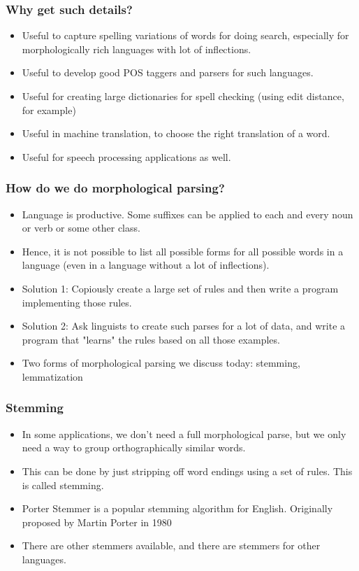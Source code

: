 \documentclass{beamer}
\begin{document}
\begin{frame}
\frametitle{Why get such details?}
\begin{itemize}
\item Useful to capture spelling variations of words for doing search, especially for morphologically rich languages with lot of inflections.
\item Useful to develop good POS taggers and parsers for such languages.
\item Useful for creating large dictionaries for spell checking (using edit distance, for example)
\item Useful in machine translation, to choose the right translation of a word.
\item Useful for speech processing applications as well.
\end{itemize}
\end{frame}

\begin{frame}
\frametitle{How do we do morphological parsing?}
\begin{itemize}
\item Language is productive. Some suffixes can be applied to each and every noun or verb or some other class.
\item Hence, it is not possible to list all possible forms for all possible words in a language (even in a language without a lot of inflections). 
\item Solution 1: Copiously create a large set of rules and then write a program implementing those rules.
\item Solution 2: Ask linguists to create such parses for a lot of data, and write a program that "learns" the rules based on all those examples.
\item Two forms of morphological parsing we discuss today: stemming, lemmatization
\end{itemize}
\end{frame}

\begin{frame}
\frametitle{Stemming}
\begin{itemize}
\item In some applications, we don't need a full morphological parse, but we only need a way to group orthographically similar words. 
\item This can be done by just stripping off word endings using a set of rules. This is called stemming.
\item Porter Stemmer is a popular stemming algorithm for English. Originally proposed by Martin Porter in 1980 
\item There are other stemmers available, and there are stemmers for other languages.
\end{itemize}
\end{frame}
\end{document}
